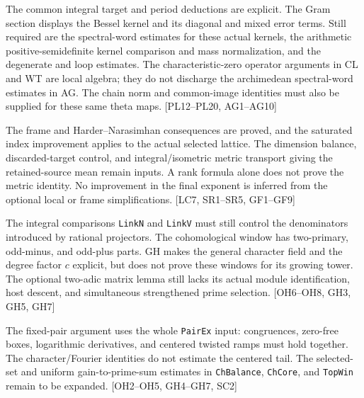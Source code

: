 \documentclass[11pt,a4paper]{article}
\numberwithin{equation}{section}
\theoremstyle{remark}\newtheorem{remark}[theorem]{Remark}
\begin{document}
\begin{description}[style=nextline]
\item[Theta identities, spectral estimates, and arithmetic kernel normalization.]
The common integral target and period deductions are explicit. The Gram section displays the Bessel kernel and its diagonal and mixed error terms. Still required are the spectral-word estimates for these actual kernels, the arithmetic positive-semidefinite kernel comparison and mass normalization, and the degenerate and loop estimates. The characteristic-zero operator arguments in CL and WT are local algebra; they do not discharge the archimedean spectral-word estimates in AG. The chain norm and common-image identities must also be supplied for these same theta maps. \textsf{[PL12--PL20, AG1--AG10]}

\item[Actual dimensions, metrics, and discarded target directions.]
The frame and Harder--Narasimhan consequences are proved, and the saturated index improvement applies to the actual selected lattice. The dimension balance, discarded-target control, and integral/isometric metric transport giving the retained-source mean remain inputs. A rank formula alone does not prove the metric identity. No improvement in the final exponent is inferred from the optional local or frame simplifications. \textsf{[LC7, SR1--SR5, GF1--GF9]}

\item[Congruence denominators and cohomological windows.]
The integral comparisons \texttt{LinkN} and \texttt{LinkV} must still control the denominators introduced by rational projectors. The cohomological window has two-primary, odd-minus, and odd-plus parts. GH makes the general character field and the degree factor $c$ explicit, but does not prove these windows for its growing tower. The optional two-adic matrix lemma still lacks its actual module identification, host descent, and simultaneous strengthened prime selection. \textsf{[OH6--OH8, GH3, GH5, GH7]}

\item[Simultaneous prime selection and the centered target.]
The fixed-pair argument uses the whole \texttt{PairEx} input: congruences, zero-free boxes, logarithmic derivatives, and centered twisted ramps must hold together. The character/Fourier identities do not estimate the centered tail. The selected-set and uniform gain-to-prime-sum estimates in \texttt{ChBalance}, \texttt{ChCore}, and \texttt{TopWin} remain to be expanded. \textsf{[OH2--OH5, GH4--GH7, SC2]}
\end{description}
\end{document}
